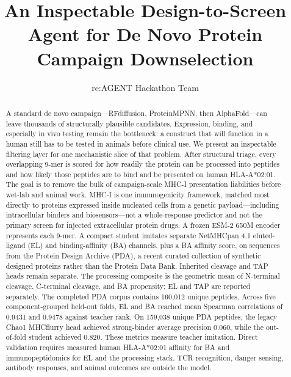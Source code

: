 \documentclass{article}
\title{An Inspectable Design-to-Screen Agent for De Novo Protein Campaign Downselection}
\author{re:AGENT Hackathon Team}
\date{}
\begin{document}
\maketitle

\begin{abstract}
A standard de novo campaign---RFdiffusion, ProteinMPNN, then AlphaFold---can leave thousands of structurally plausible candidates. Expression, binding, and especially in vivo testing remain the bottleneck: a construct that will function in a human still has to be tested in animals before clinical use. We present an inspectable filtering layer for one mechanistic slice of that problem. After structural triage, every overlapping 9-mer is scored for how readily the protein can be processed into peptides and how likely those peptides are to bind and be presented on human HLA-A*02:01. The goal is to remove the bulk of campaign-scale MHC-I presentation liabilities before wet-lab and animal work. MHC-I is one immunogenicity framework, matched most directly to proteins expressed inside nucleated cells from a genetic payload---including intracellular binders and biosensors---not a whole-response predictor and not the primary screen for injected extracellular protein drugs. A frozen ESM-2 650M encoder represents each 9-mer. A compact student imitates separate NetMHCpan 4.1 eluted-ligand (EL) and binding-affinity (BA) channels, plus a BA affinity score, on sequences from the Protein Design Archive (PDA), a recent curated collection of synthetic designed proteins rather than the Protein Data Bank. Inherited cleavage and TAP heads remain separate. The processing composite is the geometric mean of N-terminal cleavage, C-terminal cleavage, and BA propensity; EL and TAP are reported separately. The completed PDA corpus contains 160,012 unique peptides. Across five component-grouped held-out folds, EL and BA reached mean Spearman correlations of 0.9431 and 0.9478 against teacher rank. On 159,038 unique PDA peptides, the legacy Chao1 MHCflurry head achieved strong-binder average precision 0.060, while the out-of-fold student achieved 0.820. These metrics measure teacher imitation. Direct validation requires measured human HLA-A*02:01 affinity for BA and immunopeptidomics for EL and the processing stack. TCR recognition, danger sensing, antibody responses, and animal outcomes are outside the model.
\end{abstract}
\end{document}
